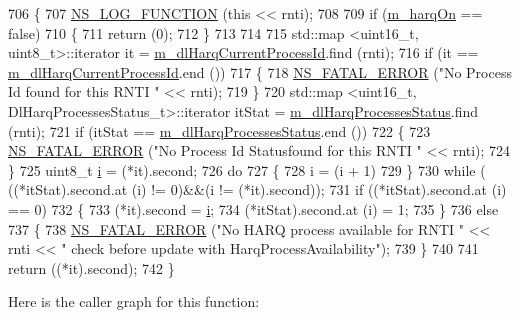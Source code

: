 \begin{DoxyCode}
706 \{
707   \hyperlink{log-macros-disabled_8h_a90b90d5bad1f39cb1b64923ea94c0761}{NS\_LOG\_FUNCTION} (\textcolor{keyword}{this} << rnti);
708 
709   \textcolor{keywordflow}{if} (\hyperlink{classns3_1_1CqaFfMacScheduler_afcb424ab57ad0d96293a7970c0b55dcf}{m\_harqOn} == \textcolor{keyword}{false})
710     \{
711       \textcolor{keywordflow}{return} (0);
712     \}
713 
714 
715   std::map <uint16\_t, uint8\_t>::iterator it = \hyperlink{classns3_1_1CqaFfMacScheduler_a1fc0136a3398fb51805a2a91e40d820e}{m\_dlHarqCurrentProcessId}.find (rnti);
716   \textcolor{keywordflow}{if} (it == \hyperlink{classns3_1_1CqaFfMacScheduler_a1fc0136a3398fb51805a2a91e40d820e}{m\_dlHarqCurrentProcessId}.end ())
717     \{
718       \hyperlink{group__fatal_ga5131d5e3f75d7d4cbfd706ac456fdc85}{NS\_FATAL\_ERROR} (\textcolor{stringliteral}{"No Process Id found for this RNTI "} << rnti);
719     \}
720   std::map <uint16\_t, DlHarqProcessesStatus\_t>::iterator itStat = 
      \hyperlink{classns3_1_1CqaFfMacScheduler_ad68bd0730def22b00204de5f3a8fb109}{m\_dlHarqProcessesStatus}.find (rnti);
721   \textcolor{keywordflow}{if} (itStat == \hyperlink{classns3_1_1CqaFfMacScheduler_ad68bd0730def22b00204de5f3a8fb109}{m\_dlHarqProcessesStatus}.end ())
722     \{
723       \hyperlink{group__fatal_ga5131d5e3f75d7d4cbfd706ac456fdc85}{NS\_FATAL\_ERROR} (\textcolor{stringliteral}{"No Process Id Statusfound for this RNTI "} << rnti);
724     \}
725   uint8\_t \hyperlink{bernuolliDistribution_8m_a6f6ccfcf58b31cb6412107d9d5281426}{i} = (*it).second;
726   \textcolor{keywordflow}{do}
727     \{
728       i = (i + 1) %
729     \}
730   \textcolor{keywordflow}{while} ( ((*itStat).second.at (i) != 0)&&(i != (*it).second));
731   \textcolor{keywordflow}{if} ((*itStat).second.at (i) == 0)
732     \{
733       (*it).second = \hyperlink{bernuolliDistribution_8m_a6f6ccfcf58b31cb6412107d9d5281426}{i};
734       (*itStat).second.at (i) = 1;
735     \}
736   \textcolor{keywordflow}{else}
737     \{
738       \hyperlink{group__fatal_ga5131d5e3f75d7d4cbfd706ac456fdc85}{NS\_FATAL\_ERROR} (\textcolor{stringliteral}{"No HARQ process available for RNTI "} << rnti << \textcolor{stringliteral}{" check before update
       with HarqProcessAvailability"});
739     \}
740 
741   \textcolor{keywordflow}{return} ((*it).second);
742 \}
\end{DoxyCode}


Here is the caller graph for this function\+:


